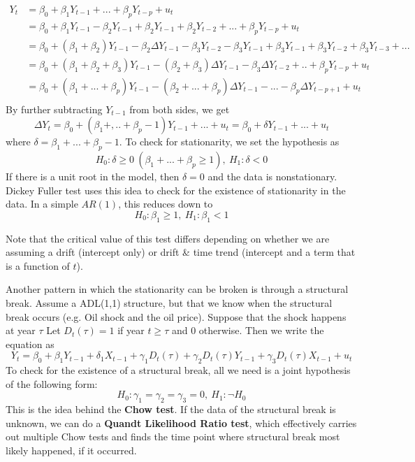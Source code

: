 \documentclass[12pt]{article}
\theoremstyle{definition}
\theoremstyle{property}
\theoremstyle{assumption}
\theoremstyle{example}
\theoremstyle{comment}
\begin{document}
\[
\begin{aligned}
 Y_t&=\beta_0 + \beta_1 Y_{t-1}+ ...+\beta_pY_{t-p}+u_t\\
 &=\beta_0 + \beta_1Y_{t-1}-\beta_2 Y_{t-1}+\beta_2Y_{t-1}+\beta_2 Y_{t-2}+...+\beta_pY_{t-p}+u_t\\
 &=\beta_0 + (\beta_1+\beta_2)Y_{t-1} -\beta_2 \Delta Y_{t-1} - \beta_3Y_{t-2}-\beta_3Y_{t-1}+\beta_3Y_{t-1}+\beta_3Y_{t-2}+\beta_3Y_{t-3}+...\\
 &=\beta_0 + (\beta_1+\beta_2+\beta_3)Y_{t-1}-(\beta_2+\beta_3)\Delta Y_{t-1} - \beta_3\Delta Y_{t-2}+ .. +\beta_pY_{t-p}+u_t
  \\
 &=\beta_0 + (\beta_1+...+\beta_p)Y_{t-1}-(\beta_2+...+\beta_p)\Delta Y_{t-1} - ... - \beta_{p}\Delta Y_{t-p+1}+u_t \\
 \end{aligned}
\]
By further subtracting $Y_{t-1}$ from both sides, we get
\[
\Delta Y_{t} = \beta_0 + (\beta_1 + ,.. +\beta_p-1) Y_{t-1}+ ... +u_t = \beta_0 + \delta Y_{t-1}+ ... +u_t 
\]
where $\delta = \beta_1 + ... +\beta_p-1$. To check for stationarity, we set the hypothesis as 
\[
H_0: \delta\geq0 \ (\beta_1+...+\beta_p\geq 1),\ H_1 : \delta<0 
\]
If there is a unit root in the model, then $\delta=0$ and the data is nonstationary. Dickey Fuller test uses this idea to check for the existence of stationarity in the data. In a simple $AR(1)$, this reduces down to
\[
H_0: \beta_1\geq 1,\ H_1 : \beta_1<1 
\]
\par\medskip
Note that the critical value of this test differs depending on whether we are assuming a drift (intercept only) or drift \& time trend (intercept and a term that is a function of $t$).
\par\medskip
Another pattern in which the stationarity can be broken is through a structural break. Assume a ADL(1,1) structure, but that we know when the structural break occurs (e.g. Oil shock and the oil price). Suppose that the shock happens at year $\tau$ Let $D_t(\tau)=1$ if year $t\geq\tau$ and 0 otherwise. Then we write the equation as
\[
Y_t = \beta_0 +\beta_1Y_{t-1}+\delta_1 X_{t-1} + \gamma_1 D_t(\tau)+\gamma_2 D_t(\tau)Y_{t-1}+\gamma_3 D_t(\tau)X_{t-1}+u_t
\]
To check for the existence of a structural break, all we need is a joint hypothesis of the following form:
\[
H_0: \gamma_1 = \gamma_2 = \gamma_3 =0, \ H_1: \lnot H_0
\]
This is the idea behind the \textbf{Chow test}. If the data of the structural break is unknown, we can do a \textbf{Quandt Likelihood Ratio test}, which effectively carries out multiple Chow tests and finds the time point where structural break most likely happened, if it occurred.  
\end{document}
